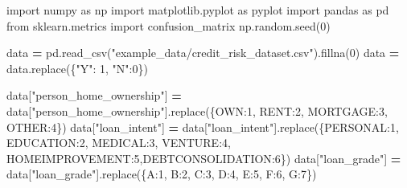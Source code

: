\documentclass[
]{book}
\newenvironment{Shaded}{\begin{snugshade}}{\end{snugshade}}
\newcommand{\DecValTok}[1]{\textcolor[rgb]{0.00,0.00,0.81}{#1}}
\newcommand{\ImportTok}[1]{#1}
\newcommand{\NormalTok}[1]{#1}
\newcommand{\OperatorTok}[1]{\textcolor[rgb]{0.81,0.36,0.00}{\textbf{#1}}}
\newcommand{\StringTok}[1]{\textcolor[rgb]{0.31,0.60,0.02}{#1}}
\begin{document}
\begin{Shaded}
\begin{Highlighting}[]
\ImportTok{import}\NormalTok{ numpy }\ImportTok{as}\NormalTok{ np}
\ImportTok{import}\NormalTok{ matplotlib.pyplot }\ImportTok{as}\NormalTok{ pyplot}
\ImportTok{import}\NormalTok{ pandas }\ImportTok{as}\NormalTok{ pd}
\ImportTok{from}\NormalTok{ sklearn.metrics }\ImportTok{import}\NormalTok{ confusion\_matrix}
\NormalTok{np.random.seed(}\DecValTok{0}\NormalTok{)}

\NormalTok{data }\OperatorTok{=}\NormalTok{ pd.read\_csv(}\StringTok{"example\_data/credit\_risk\_dataset.csv"}\NormalTok{).fillna(}\DecValTok{0}\NormalTok{)}
\NormalTok{data }\OperatorTok{=}\NormalTok{ data.replace(\{}\StringTok{"Y"}\NormalTok{: }\DecValTok{1}\NormalTok{, }\StringTok{"N"}\NormalTok{:}\DecValTok{0}\NormalTok{\})}

\NormalTok{data[}\StringTok{"person\_home\_ownership"}\NormalTok{] }\OperatorTok{=}\NormalTok{ data[}\StringTok{"person\_home\_ownership"}\NormalTok{].replace(\{}\StringTok{\textquotesingle{}OWN\textquotesingle{}}\NormalTok{:}\DecValTok{1}\NormalTok{, }\StringTok{\textquotesingle{}RENT\textquotesingle{}}\NormalTok{:}\DecValTok{2}\NormalTok{, }\StringTok{\textquotesingle{}MORTGAGE\textquotesingle{}}\NormalTok{:}\DecValTok{3}\NormalTok{, }\StringTok{\textquotesingle{}OTHER\textquotesingle{}}\NormalTok{:}\DecValTok{4}\NormalTok{\})}
\NormalTok{data[}\StringTok{"loan\_intent"}\NormalTok{] }\OperatorTok{=}\NormalTok{ data[}\StringTok{"loan\_intent"}\NormalTok{].replace(\{}\StringTok{\textquotesingle{}PERSONAL\textquotesingle{}}\NormalTok{:}\DecValTok{1}\NormalTok{, }\StringTok{\textquotesingle{}EDUCATION\textquotesingle{}}\NormalTok{:}\DecValTok{2}\NormalTok{, }\StringTok{\textquotesingle{}MEDICAL\textquotesingle{}}\NormalTok{:}\DecValTok{3}\NormalTok{, }\StringTok{\textquotesingle{}VENTURE\textquotesingle{}}\NormalTok{:}\DecValTok{4}\NormalTok{, }\StringTok{\textquotesingle{}HOMEIMPROVEMENT\textquotesingle{}}\NormalTok{:}\DecValTok{5}\NormalTok{,}\StringTok{\textquotesingle{}DEBTCONSOLIDATION\textquotesingle{}}\NormalTok{:}\DecValTok{6}\NormalTok{\})}
\NormalTok{data[}\StringTok{"loan\_grade"}\NormalTok{] }\OperatorTok{=}\NormalTok{ data[}\StringTok{"loan\_grade"}\NormalTok{].replace(\{}\StringTok{\textquotesingle{}A\textquotesingle{}}\NormalTok{:}\DecValTok{1}\NormalTok{, }\StringTok{\textquotesingle{}B\textquotesingle{}}\NormalTok{:}\DecValTok{2}\NormalTok{, }\StringTok{\textquotesingle{}C\textquotesingle{}}\NormalTok{:}\DecValTok{3}\NormalTok{, }\StringTok{\textquotesingle{}D\textquotesingle{}}\NormalTok{:}\DecValTok{4}\NormalTok{, }\StringTok{\textquotesingle{}E\textquotesingle{}}\NormalTok{:}\DecValTok{5}\NormalTok{, }\StringTok{\textquotesingle{}F\textquotesingle{}}\NormalTok{:}\DecValTok{6}\NormalTok{, }\StringTok{\textquotesingle{}G\textquotesingle{}}\NormalTok{:}\DecValTok{7}\NormalTok{\})}



\end{Highlighting}
\end{Shaded}
\end{document}
